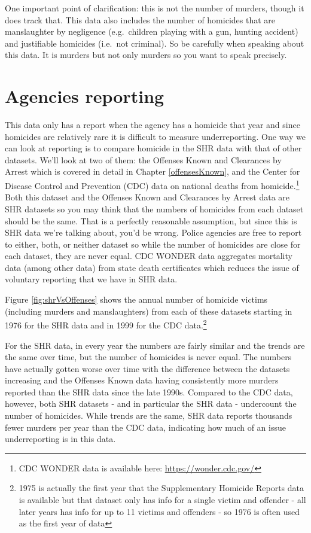\documentclass[
]{krantz}
\begin{document}
One important point of clarification: this is not the number
of murders, though it does track that. This data also
includes the number of homicides that are manslaughter by
negligence (e.g.~children playing with a gun, hunting
accident) and justifiable homicides (i.e.~not criminal). So
be carefully when speaking about this data. It is murders
but not only murders so you want to speak precisely.

\section{Agencies reporting}\label{agencies-reporting-2}

This data only has a report when the agency has a homicide
that year and since homicides are relatively rare it is
difficult to measure underreporting. One way we can look at
reporting is to compare homicide in the SHR data with that
of other datasets. We'll look at two of them: the Offenses
Known and Clearances by Arrest which is covered in detail in
Chapter \ref{offensesKnown}, and the Center for Disease
Control and Prevention (CDC) data on national deaths from
homicide.\footnote{CDC WONDER data is available here:
  \url{https://wonder.cdc.gov/}} Both this dataset and the
Offenses Known and Clearances by Arrest data are SHR
datasets so you may think that the numbers of homicides from
each dataset should be the same. That is a perfectly
reasonable assumption, but since this is SHR data we're
talking about, you'd be wrong. Police agencies are free to
report to either, both, or neither dataset so while the
number of homicides are close for each dataset, they are
never equal. CDC WONDER data aggregates mortality data
(among other data) from state death certificates which
reduces the issue of voluntary reporting that we have in SHR
data.

Figure \ref{fig:shrVsOffenses} shows the annual number of
homicide victims (including murders and manslaughters) from
each of these datasets starting in 1976 for the SHR data and
in 1999 for the CDC data.\footnote{1975 is actually the
  first year that the Supplementary Homicide Reports data is
  available but that dataset only has info for a single
  victim and offender - all later years has info for up to
  11 victims and offenders - so 1976 is often used as the
  first year of data}

For the SHR data, in every year the numbers are fairly
similar and the trends are the same over time, but the
number of homicides is never equal. The numbers have
actually gotten worse over time with the difference between
the datasets increasing and the Offenses Known data having
consistently more murders reported than the SHR data since
the late 1990s. Compared to the CDC data, however, both SHR
datasets - and in particular the SHR data - undercount the
number of homicides. While trends are the same, SHR data
reports thousands fewer murders per year than the CDC data,
indicating how much of an issue underreporting is in this
data.
\end{document}
